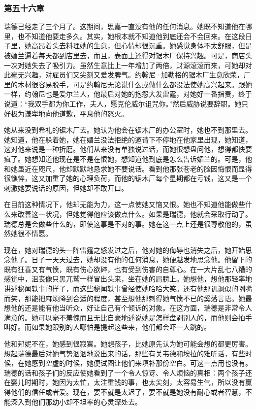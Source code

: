 \subsubsection{第五十六章}

\par 瑞德已经走了三个月了。这期间，思嘉一直没有他的任何消息。她既不知道他在哪里，也不知道他要走多久。其实，她根本就不知道他到底还会不会回来。在这段日子里，她高昂着头去料理她的生意，但心情却很沉重。她感觉身体不太舒服，但是被媚兰逼着每天都到店里去，而且，表面上还得对锯木厂保持兴趣。可是，商店头一次对她失去了吸引力。虽然生意比上一年增加了两倍，财源滚滚而来，可她却对此毫无兴趣，对雇员们又尖刻又爱发脾气。约翰尼·加勒格的锯木厂生意欣荣，厂里的木材很容易脱手，可是约翰尼无论说什么或做什么都没法使她高兴起来。跟她一样，约翰尼也是爱尔兰人，他最后对她的抱怨大发雷霆，对她好一番指责，终于说道：“我双手都为你工作，夫人，愿克伦威尔诅咒你。”然后威胁说要辞职。她只好极为谦卑地向他道歉，平息他的怒火。
\par 她从来没到希礼的锯木厂去。她认为他会在锯木厂的办公室时，她也不到那里去。她知道，他在躲着她，她在媚兰没法拒绝的邀请下不停地在他家里出现，她知道，这对他来说是一种折磨。他们从来没有单独说过话，而她很想盘问他，想得都快要疯了。她想知道他现在是不是在恨她，想知道他到底是怎么告诉媚兰的。可是，他和她虽近在咫尺，他却默默地恳求她不要说话。看到他那张苍老的脸因悔恨而显得很憔悴，这又加重了她的心理负荷，而他的锯木厂每个星期都在亏钱，这又是一个刺激她要说话的原因，但她却不敢开口。
\par 在目前这种情况下，他却无能为力，这一点使她又恼又恨。她也不知道他能做些什么来改善这一状况，但她觉得他应该做点什么。如果是瑞德，他就会采取行动了。瑞德总是会做些什么的，即使这事是不对的事。她在这一点上还是很尊敬他的，虽然她很不情愿。
\par 现在，她对瑞德的头一阵雷霆之怒发过之后，他对她的侮辱也消失之后，她开始思念他了。日子一天天过去，她却没有他的任何消息，她便越发地思念他。他留下的既有狂喜又有气愤，既有伤心欲碎，也有受到伤害的自尊心。在一大片乱七八糟的感觉中，沮丧像只黑兀鹫一样冒出头来，坐在她的肩膀上。她想他，想他那轻率地讲述秘闻轶事的样子，而这些秘闻轶事曾经使她哈哈大笑。还有他那讥讽似的咧嘴而笑，那能把麻烦降到合适的程度，甚至想他那刺得她气愤不已的奚落言语。她最想他的还是能有他当听众，好让自己有个倾诉的对象。在这方面，瑞德是非常令人满意的。她可以毫不羞愧而且无比自豪地述说她是怎样盘剥别人的，而他则会拍手叫好。而如果她跟别的人哪怕是提起这些来，他们都会吓一大跳的。
\par 他和邦妮不在，她感到很寂寞。她想孩子，比她原先认为她可能会想的都更厉害。想起瑞德最后对她气势汹汹地说出来的话，那些有关韦德和埃拉的难听话，有些时候，在她感到空虚的时候，她便试图让他们来填补那份空白。可这一点用也没有。瑞德的话和孩子们的反应使她看到了一个令人惊讶、令人烦恼的真相：两个孩子还在婴儿时期时，她因为太忙，太注重钱的事，也太尖刻，太容易生气，所以没有赢得他们的信任或者爱。现在，要不就是太迟了，要不就是她没有耐心或者智慧，不能深入到他们那幼小却不坦率的心灵深处去。
